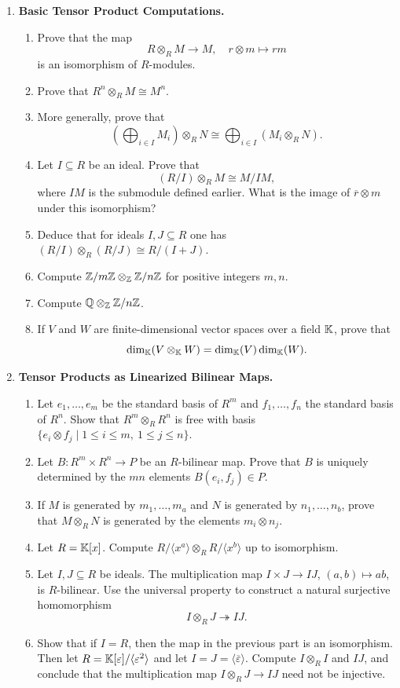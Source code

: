 \documentclass[12pt,reqno]{amsart}
\begin{document}
\begin{enumerate}[leftmargin=*, resume=problems]
\item \textbf{Basic Tensor Product Computations.}
    \begin{enumerate}
    \item Prove that the map
    \[
    R\otimes_R M\to M,
    \quad
    r\otimes m\longmapsto rm
    \]
    is an isomorphism of $R$-modules.
    \item Prove that $R^n\otimes_R M\cong M^n$.
    \item More generally, prove that
    \[
    \left(\bigoplus_{i\in I}M_i\right)\otimes_R N\cong \bigoplus_{i\in I}(M_i\otimes_R N).
    \]
    \item Let $I\subseteq R$ be an ideal. Prove that
    \[
    (R/I)\otimes_R M\cong M/IM,
    \]
    where $IM$ is the submodule defined earlier. What is the image of $\overline{r}\otimes m$ under this isomorphism?
    \item Deduce that for ideals $I,J\subseteq R$ one has $ (R/I)\otimes_R(R/J)\cong R/(I+J)$.
    \item Compute $\mathbb{Z}/m\mathbb{Z}\otimes_{\mathbb{Z}}\mathbb{Z}/n\mathbb{Z}$ for positive integers $m,n$.
    \item Compute $\mathbb{Q}\otimes_{\mathbb{Z}}\mathbb{Z}/n\mathbb{Z}$.
    \item If $V$ and $W$ are finite-dimensional vector spaces over a field $\mathbb{K}$, prove that
    \[
    \dim_{\mathbb{K}}(V\otimes_{\mathbb{K}}W)=\dim_{\mathbb{K}}(V)\dim_{\mathbb{K}}(W).
    \]
    \end{enumerate}

\item \textbf{Tensor Products as Linearized Bilinear Maps.}
    \begin{enumerate}
    \item Let $e_1,\ldots,e_m$ be the standard basis of $R^m$ and $f_1,\ldots,f_n$ the standard basis of $R^n$. Show that $R^m\otimes_R R^n$ is free with basis $\{e_i\otimes f_j\mid 1\leq i\leq m,\ 1\leq j\leq n\}$.
    \item Let $B:R^m\times R^n\to P$ be an $R$-bilinear map. Prove that $B$ is uniquely determined by the $mn$ elements $B(e_i,f_j)\in P$.
    \item If $M$ is generated by $m_1,\ldots,m_a$ and $N$ is generated by $n_1,\ldots,n_b$, prove that $M\otimes_R N$ is generated by the elements $m_i\otimes n_j$.
    \item Let $R=\mathbb{K}[x]$. Compute $R/\langle x^a\rangle\otimes_R R/\langle x^b\rangle$ up to isomorphism.
    \item Let $I,J\subseteq R$ be ideals. The multiplication map $I\times J\to IJ$, $(a,b)\mapsto ab$, is $R$-bilinear. Use the universal property to construct a natural surjective homomorphism
    \[
    I\otimes_R J\twoheadrightarrow IJ.
    \]
    \item Show that if $I=R$, then the map in the previous part is an isomorphism. Then let $R=\mathbb{K}[\varepsilon]/\langle \varepsilon^2\rangle$ and let $I=J=\langle \overline{\varepsilon}\rangle$. Compute $I\otimes_R I$ and $IJ$, and conclude that the multiplication map $I\otimes_R J\to IJ$ need not be injective.
    \end{enumerate}
\end{enumerate}
\end{document}
